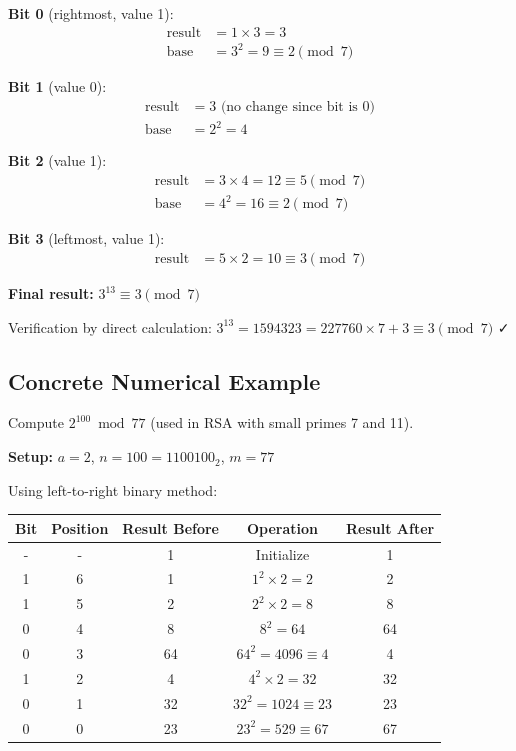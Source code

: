 \documentclass[12pt,a4paper]{article}
\theoremstyle{definition}
\begin{document}
\textbf{Bit 0} (rightmost, value 1):
\begin{align}
\text{result} &= 1 \times 3 = 3\\
\text{base} &= 3^2 = 9 \equiv 2 \pmod{7}
\end{align}

\textbf{Bit 1} (value 0):
\begin{align}
\text{result} &= 3 \text{ (no change since bit is 0)}\\
\text{base} &= 2^2 = 4
\end{align}

\textbf{Bit 2} (value 1):
\begin{align}
\text{result} &= 3 \times 4 = 12 \equiv 5 \pmod{7}\\
\text{base} &= 4^2 = 16 \equiv 2 \pmod{7}
\end{align}

\textbf{Bit 3} (leftmost, value 1):
\begin{align}
\text{result} &= 5 \times 2 = 10 \equiv 3 \pmod{7}
\end{align}

\textbf{Final result:} $3^{13} \equiv 3 \pmod{7}$

Verification by direct calculation:
$3^{13} = 1594323 = 227760 \times 7 + 3 \equiv 3 \pmod{7}$ ✓

\subsection{Concrete Numerical Example}

Compute $2^{100} \bmod 77$ (used in RSA with small primes 7 and 11).

\textbf{Setup:} $a = 2$, $n = 100 = 1100100_2$, $m = 77$

Using left-to-right binary method:

\begin{center}
\begin{tabular}{|c|c|c|c|c|}
\hline
Bit & Position & Result Before & Operation & Result After \\
\hline
- & - & 1 & Initialize & 1 \\
1 & 6 & 1 & $1^2 \times 2 = 2$ & 2 \\
1 & 5 & 2 & $2^2 \times 2 = 8$ & 8 \\  
0 & 4 & 8 & $8^2 = 64$ & 64 \\
0 & 3 & 64 & $64^2 = 4096 \equiv 4$ & 4 \\
1 & 2 & 4 & $4^2 \times 2 = 32$ & 32 \\
0 & 1 & 32 & $32^2 = 1024 \equiv 23$ & 23 \\
0 & 0 & 23 & $23^2 = 529 \equiv 67$ & 67 \\
\hline
\end{tabular}
\end{center}
\end{document}
